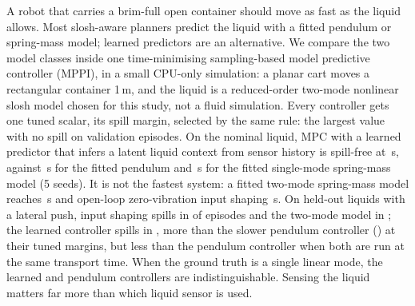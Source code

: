 A robot that carries a brim-full open container should move as fast as the liquid allows. Most slosh-aware planners predict the liquid with a fitted pendulum or spring-mass model; learned predictors are an alternative. We compare the two model classes inside one time-minimising sampling-based model predictive controller (MPPI), in a small CPU-only simulation: a planar cart moves a rectangular container 1\,m, and the liquid is a reduced-order two-mode nonlinear slosh model chosen for this study, not a fluid simulation. Every controller gets one tuned scalar, its spill margin, selected by the same rule: the largest value with no spill on validation episodes. On the nominal liquid, MPC with a learned predictor that infers a latent liquid context from sensor history is spill-free at \,s, against \,s for the fitted pendulum and \,s for the fitted single-mode spring-mass model (5 seeds). It is not the fastest system: a fitted two-mode spring-mass model reaches \,s and open-loop zero-vibration input shaping \,s. On held-out liquids with a lateral push, input shaping spills in  of episodes and the two-mode model in ; the learned controller spills in , more than the slower pendulum controller () at their tuned margins, but less than the pendulum controller when both are run at the same transport time. When the ground truth is a single linear mode, the learned and pendulum controllers are indistinguishable. Sensing the liquid matters far more than which liquid sensor is used.
